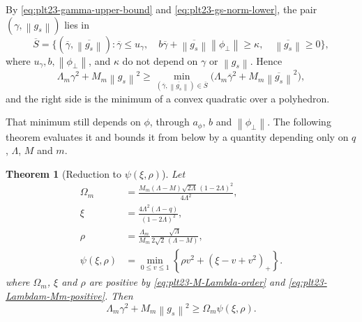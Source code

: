 \documentclass[11pt]{article}
\newtheorem{theorem}{Theorem}[section]
\numberwithin{equation}{section}
\newcommand{\norm}[1]{\left\lVert #1\right\rVert}
\newcommand{\pos}[1]{\left(#1\right)_{+}}
\begin{document}
By \eqref{eq:plt23-gamma-upper-bound} and \eqref{eq:plt23-gs-norm-lower}, the pair
$(\gamma,\norm{g_s})$ lies in
\begin{equation}\label{eq:plt23-Sbar}
  \overline S=\bigl\{(\overline\gamma,\overline{\norm{g_s}}):
  \overline\gamma\le u_\gamma,\quad
  b\overline\gamma+\overline{\norm{g_s}}\norm{\phi_\perp}\ge\kappa,\quad
  \overline{\norm{g_s}}\ge0\bigr\},
\end{equation}
where $u_\gamma, b, \norm{\phi_\perp}$, and $\kappa$ do not depend on
$\gamma$ or $\norm{g_s}$.
Hence
\begin{equation}\label{eq:plt23-min-over-Sbar}
  \Lambda_m\gamma^2+M_m\norm{g_s}^2
  \ge\min_{(\overline\gamma,\overline{\norm{g_s}})\in\overline S}
  \bigl(\Lambda_m\overline\gamma^2+M_m\overline{\norm{g_s}}^2\bigr),
\end{equation}
and the right side is the minimum of a convex quadratic over a polyhedron.

That minimum still depends on $\phi$, through $a_\phi$, $b$ and
$\norm{\phi_\perp}$.  The following theorem evaluates it and bounds it from
below by a quantity depending only on $q$, $\Lambda$, $M$ and $m$.

\begin{theorem}[Reduction to $\psi(\xi,\rho)$]\label{thm:plt23-huber-elim}
  Let
  \begin{align}
    \Omega_m&=\frac{M_m(\Lambda-M)\sqrt{2\Lambda}\,(1-2\Lambda)^2}{4\Lambda^2},
    \label{eq:plt23-C-xi-rho}\\
    \xi&=\frac{4\Lambda^2(\Lambda-q)}{(1-2\Lambda)^2},
    \label{eq:plt23-xi-def}\\
    \rho&=\frac{\Lambda_m}{M_m}\frac{\sqrt\Lambda}{2\sqrt2\,(\Lambda-M)},
    \label{eq:plt23-rho-def}\\
    \psi(\xi,\rho)&=
    \min_{0\le v\le1}
    \left\{\rho v^2+\pos{\xi-v+v^2}\right\}.
    \label{eq:plt23-psi-def}
  \end{align}
  where $\Omega_m$, $\xi$ and $\rho$ are positive by
  \eqref{eq:plt23-M-Lambda-order} and \eqref{eq:plt23-Lambdam-Mm-positive}.
  Then
  \begin{equation}\label{eq:plt23-huber-payment}
    \Lambda_m\gamma^2+M_m\norm{g_s}^2
    \ge \Omega_m\psi(\xi,\rho).
  \end{equation}
\end{theorem}
\end{document}
